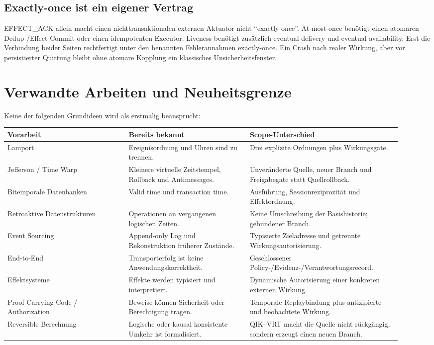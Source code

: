 \documentclass[11pt,a4paper]{article}
\theoremstyle{remark}
\begin{document}
\subsection{Exactly-once ist ein eigener Vertrag}

EFFECT\_ACK allein macht einen nichttransaktionalen externen Aktuator nicht
``exactly once''. At-most-once benötigt einen atomaren Dedup-/Effect-Commit
oder einen idempotenten Executor. Liveness benötigt zusätzlich eventual
delivery und eventual availability. Erst die Verbindung beider Seiten
rechtfertigt unter den benannten Fehlerannahmen exactly-once. Ein Crash nach
realer Wirkung, aber vor persistierter Quittung bleibt ohne atomare Kopplung
ein klassisches Unsicherheitsfenster.

\section{Verwandte Arbeiten und Neuheitsgrenze}

Keine der folgenden Grundideen wird als erstmalig beansprucht:

\begin{longtable}{@{}L{0.28\linewidth}L{0.29\linewidth}L{0.35\linewidth}@{}}
\toprule
\textbf{Vorarbeit} & \textbf{Bereits bekannt} & \textbf{Scope-Unterschied} \\
\midrule
\endhead
Lamport \cite{lamport} & Ereignisordnung und Uhren sind zu trennen. & Drei
explizite Ordnungen plus Wirkungsgate.\\
Jefferson / Time Warp \cite{jefferson} & Kleinere virtuelle Zeitstempel,
Rollback und Antimessages. & Unveränderte Quelle, neuer Branch und
Freigabegate statt Quellrollback.\\
Bitemporale Datenbanken \cite{snodgrass} & Valid time und transaction time. &
Ausführung, Sessionreziprozität und Effektordnung.\\
Retroaktive Datenstrukturen \cite{demaine} & Operationen an vergangenen
logischen Zeiten. & Keine Umschreibung der Basishistorie; gebundener Branch.\\
Event Sourcing \cite{fowler} & Append-only Log und Rekonstruktion früherer
Zustände. & Typisierte Zieladresse und getrennte Wirkungsautorisierung.\\
End-to-End \cite{saltzer} & Transporterfolg ist keine
Anwendungskorrektheit. & Geschlossener Policy-/Evidenz-/Verantwortungsrecord.\\
Effektsysteme \cite{lucassen,plotkin} & Effekte werden typisiert und
interpretiert. & Dynamische Autorisierung einer konkreten externen Wirkung.\\
Proof-Carrying Code / Authorization \cite{necula,appel} & Beweise können
Sicherheit oder Berechtigung tragen. & Temporale Replaybindung plus
antizipierte und beobachtete Wirkung.\\
Reversible Berechnung \cite{bennett,danos} & Logische oder kausal konsistente
Umkehr ist formalisiert. & QIK--VRT macht die Quelle nicht rückgängig, sondern
erzeugt einen neuen Branch.\\
\bottomrule
\end{longtable}
\end{document}
